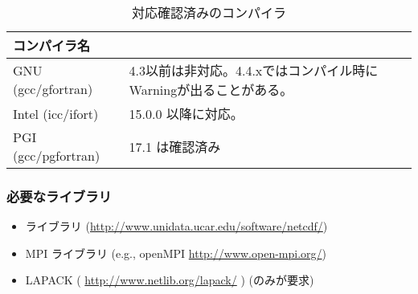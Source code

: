 

\begin{table}[htb]
\begin{center}
\caption{対応確認済みのコンパイラ}
\begin{tabularx}{150mm}{|l|X|X|} \hline
 \rowcolor[gray]{0.9} コンパイラ名 & \\ \hline
 GNU (gcc/gfortran)    & 4.3以前は非対応。4.4.xではコンパイル時にWarningが出ることがある。 \\ \hline
 Intel (icc/ifort)     & 15.0.0 以降に対応。 \\ \hline
 PGI (gcc/pgfortran)   & 17.1 は確認済み              \\ \hline
\end{tabularx}
\label{tab:compatible_compiler}
\end{center}
\end{table}

\subsubsection{\bf 必要なライブラリ}\label{sec:inst_env}
  \begin{itemize}
   \item {\netcdf} ライブラリ (\url{http://www.unidata.ucar.edu/software/netcdf/})
   \item MPI ライブラリ (e.g., openMPI \url{http://www.open-mpi.org/})
   \item LAPACK ( \url{http://www.netlib.org/lapack/} ) (\scalegm のみが要求)
  \end{itemize}

